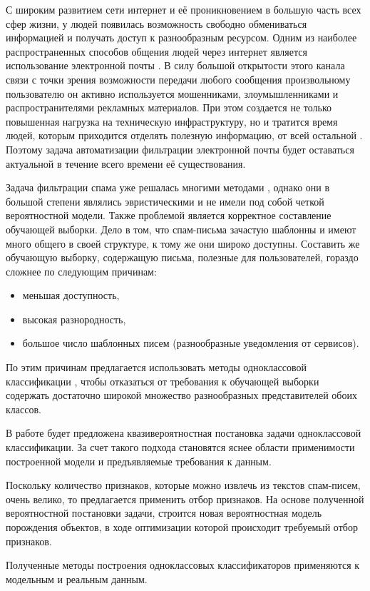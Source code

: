 С широким развитием сети интернет и её проникновением в большую часть всех сфер жизни, у людей появилась возможность свободно обмениваться информацией и получать доступ к разнообразным ресурсом. 
Одним из наиболее распространенных способов общения людей через интернет является использование электронной почты \cite{}. 
В силу большой открытости этого канала связи с точки зрения возможности передачи любого сообщения произвольному пользователю он активно используется мошенниками, злоумышленниками и распространителями рекламных материалов. При этом создается не только повышенная нагрузка на техническую инфраструктуру, но и тратится время людей, которым приходится отделять полезную информацию, от всей остальной \cite{}. 
Поэтому задача автоматизации фильтрации электронной почты будет оставаться актуальной в течение всего времени её существования.

Задача фильтрации спама уже решалась многими методами \cite{}, однако они в большой степени являлись эвристическими и не имели под собой четкой вероятностной модели. 
Также проблемой является корректное составление обучающей выборки. 
Дело в том, что спам-письма зачастую шаблонны и имеют много общего в своей структуре, к тому же они широко доступны. 
Составить же обучающую выборку, содержащую письма, полезные для пользователей, гораздо сложнее по следующим причинам:
\begin{itemize}
	\item меньшая доступность,
	\item высокая разнородность,
	\item большое число шаблонных писем (разнообразные уведомления от сервисов).
\end{itemize}
По этим причинам предлагается использовать методы одноклассовой классификации \cite{}, чтобы отказаться от требования к обучающей выборки содержать достаточно широкой множество разнообразных представителей обоих классов.

В работе будет предложена квазивероятностная постановка задачи одноклассовой классификации. 
За счет такого подхода становятся яснее области применимости построенной модели и предъявляемые требования к данным.

Поскольку количество признаков, которые можно извлечь из текстов спам-писем, очень велико, то предлагается применить отбор признаков. 
На основе полученной вероятностной постановки задачи, строится новая вероятностная модель порождения объектов, в ходе оптимизации которой происходит требуемый отбор признаков.

Полученные методы построения одноклассовых классификаторов применяются к модельным и реальным данным.

